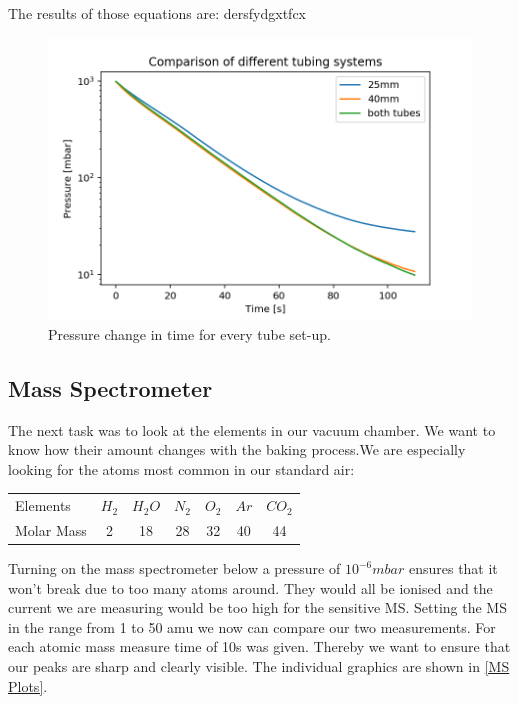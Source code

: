 \documentclass[]{article}
\begin{document}
The results of those equations are: dersfydgxtfcx

\begin{figure}[!h]
\centering\includegraphics[width=1\textwidth]{Plots/Comparison.png}
\caption{Pressure change in time for every tube set-up.}
\label{fig::comparison}
\end{figure}

\subsection{Mass Spectrometer}
The next task was to look at the elements in our vacuum chamber. We want to know how their amount changes with the baking process.We are especially looking for the atoms most common in our standard air:

\begin{table}[!h]
\centering
\begin{tabular}{lcccccc}
Elements & $H_2$ & $H_2O$ & $N_2$ & $O_2$ & $Ar$ & $CO_2$ \\
Molar Mass & 2 & 18 & 28 & 32 & 40 & 44 \\
\end{tabular} 
\end{table}

Turning on the mass spectrometer below a pressure of $10^{-6} mbar$ ensures that it won't break due to too many atoms around. They would all be ionised and the current we are measuring would be too high for the sensitive MS. Setting the MS in the range from 1 to 50 amu we now can compare our two measurements. For each atomic mass measure time of 10s was given. Thereby we want to ensure that our peaks are sharp and clearly visible. The individual graphics are shown in \ref{MS Plots}.
\end{document}
